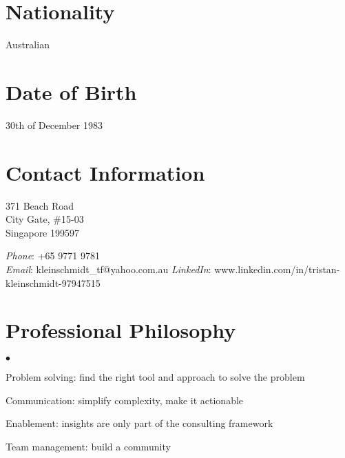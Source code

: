 \documentclass[margin,line]{resume}
\newenvironment{list2}{
  \begin{list}{$\bullet$}{%
      \setlength{\itemsep}{0in}
      \setlength{\parsep}{0in} \setlength{\parskip}{0in}
      \setlength{\topsep}{0in} \setlength{\partopsep}{0in}
      \setlength{\leftmargin}{0.2in}}}{\end{list}}
\begin{document}
\begin{resume}

\section{\sc Nationality}
Australian

\section{\sc Date of Birth}
30th of December 1983

\section{\sc Contact Information}

\parbox[t]{3.3in}{%
371 Beach Road\\
City Gate, \#15-03\\
Singapore 199597}
\parbox[t]{2.3in}{%
{\it Phone}: {+65 9771 9781}  \\
{\it Email}: {kleinschmidt\_tf@yahoo.com.au}
{\it LinkedIn}: {www.linkedin.com/in/tristan-kleinschmidt-97947515}
}


\section{\sc Professional Philosophy}
\begin{list2}
\item Problem solving: find the right tool and approach to solve the problem
\item Communication: simplify complexity, make it actionable
\item Enablement: insights are only part of the consulting framework
\item Team management: build a community
\end{list2}


\end{resume}
\end{document}
